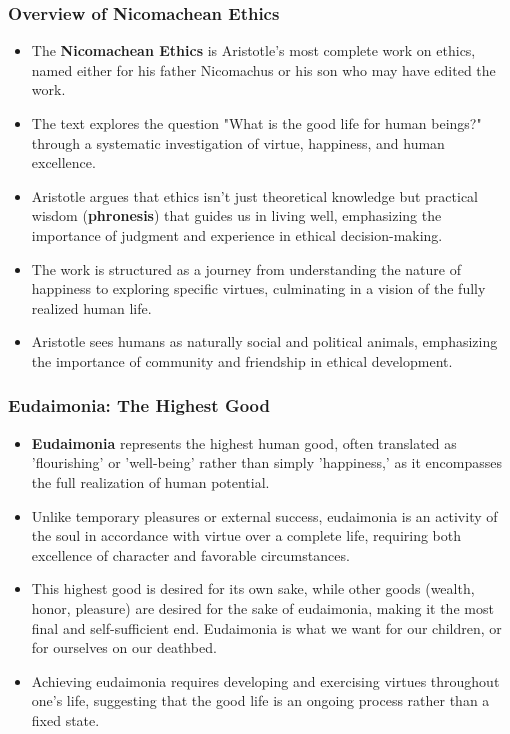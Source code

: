 \documentclass{beamer}
\begin{document}
\begin{frame}
    \frametitle{Overview of Nicomachean Ethics}
    \begin{itemize}
        \item The \textbf{Nicomachean Ethics} is Aristotle's most complete work on ethics, named either for his father Nicomachus or his son who may have edited the work.
        
        \item The text explores the question "What is the good life for human beings?" through a systematic investigation of virtue, happiness, and human excellence.
        
        \item Aristotle argues that ethics isn't just theoretical knowledge but practical wisdom (\textbf{phronesis}) that guides us in living well, emphasizing the importance of judgment and experience in ethical decision-making.
        
        \item The work is structured as a journey from understanding the nature of happiness to exploring specific virtues, culminating in a vision of the fully realized human life.
        
        \item Aristotle sees humans as naturally social and political animals, emphasizing the importance of community and friendship in ethical development. 
    \end{itemize}
\end{frame}

\begin{frame}
    \frametitle{Eudaimonia: The Highest Good}
    \begin{itemize}
        \item \textbf{Eudaimonia} represents the highest human good, often translated as 'flourishing' or 'well-being' rather than simply 'happiness,' as it encompasses the full realization of human potential.
        
        \item Unlike temporary pleasures or external success, eudaimonia is an activity of the soul in accordance with virtue over a complete life, requiring both excellence of character and favorable circumstances.
        
        \item This highest good is desired for its own sake, while other goods (wealth, honor, pleasure) are desired for the sake of eudaimonia, making it the most final and self-sufficient end. Eudaimonia is what we want for our children, or for ourselves on our deathbed.
        
        \item Achieving eudaimonia requires developing and exercising virtues throughout one's life, suggesting that the good life is an ongoing process rather than a fixed state.
    \end{itemize}
\end{frame}
\end{document}
